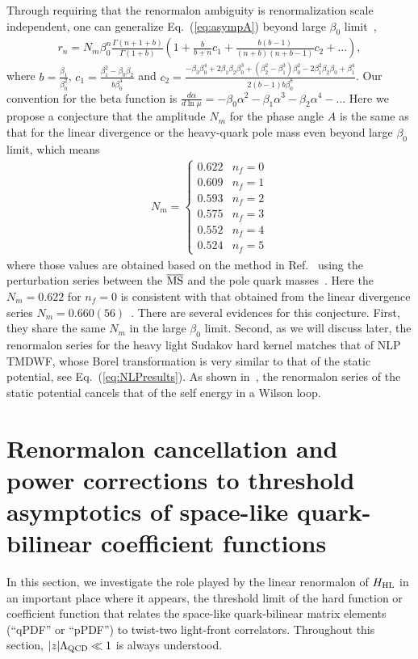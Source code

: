 \documentclass[a4paper,11pt]{article}
\begin{document}
Through requiring that the renormalon ambiguity is renormalization scale independent, one can generalize Eq.~(\ref{eq:asympA}) beyond large $\beta_0$ limit~\cite{Beneke:1994rs,Pineda:2001zq},
\begin{align}\label{eq:asympAb}
r_{n} = N_m \beta_0^n \frac{\Gamma(n+1+b)}{\Gamma(1+b)} \left( 1+ \frac{b}{b+n} c_1 + \frac{b(b-1)}{(n+b)(n+b-1)} c_2 + ...\right),
\end{align}
where $b = \frac{\beta_1}{\beta_0^2}$, $c_1 = \frac{\beta_1^2 - \beta_0 \beta_2}{b \beta_0^4}$ and $c_2 = \frac{-\beta _3 \beta _0^4+2 \beta _1 \beta _2 \beta _0^3+\left(\beta _2^2-\beta _1^3\right)\beta _0^2-2 \beta _1^2 \beta _2 \beta _0+\beta _1^4}{2 (b-1) b \beta _0^8}$. Our convention for the beta function is $\frac{d \alpha}{d \ln \mu} = -\beta_0 \alpha^2 -\beta_1 \alpha^3 - \beta_2 \alpha^4 -...$ Here we propose a conjecture that the amplitude $N_m$ for the phase angle $A$ is the same as that for the linear divergence or the heavy-quark pole mass even beyond large $\beta_0$ limit, which means 
\begin{align}
    N_m = 
    \begin{cases}
        0.622 & n_f = 0 \\
        0.609 & n_f = 1 \\
        0.593 & n_f = 2 \\
        0.575 & n_f = 3 \\
        0.552 & n_f = 4 \\
        0.524 & n_f = 5 
    \end{cases}
\end{align}
where those values are obtained based on the method in Ref.~\cite{Pineda:2001zq} using the perturbation series between the $\overline{\rm MS}$ and the pole quark masses~\cite{Melnikov:2000qh}. Here the $N_m=0.622$ for $n_f=0$ is consistent with that obtained from the linear divergence series $N_m = 0.660(56)$~\cite{Bali:2013pla}. There are several evidences for this conjecture. First, they share the same $N_m$ in the large $\beta_0$ limit. Second, as we will discuss later, the renormalon series for the heavy light Sudakov hard kernel matches that of NLP TMDWF, whose Borel transformation is very similar to that of the static potential, see Eq.~(\ref{eq:NLPresults}). As shown in~\cite{Pineda:2002se}, the renormalon series of the static potential cancels that of the self energy in a Wilson loop.


\section{Renormalon cancellation and power corrections to threshold asymptotics of space-like quark-bilinear coefficient functions} \label{sec:threshold}
In this section, we investigate the role played by the linear renormalon of $H_{\rm HL}$ in an important place where it appears, the threshold limit of the hard function or coefficient function that relates the space-like quark-bilinear matrix elements (``qPDF'' or ``pPDF'') to twist-two light-front correlators.  Throughout this section, $|z|\Lambda_{\rm QCD} \ll 1$ is always understood. 
\end{document}
